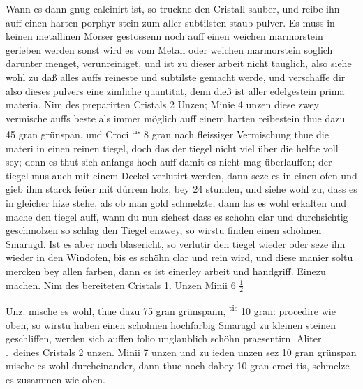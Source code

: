 Wann es dann gnug calcinirt ist, so truckne den Cristall sauber, und reibe ihn auff einen harten porphyr-stein zum aller subtilsten staub-pulver. Es muss in keinen metallinen M\"{o}rser gestossenn noch auff einen weichen marmorstein gerieben werden sonst wird es vom Metall oder weichen marmorstein soglich darunter menget, verunreiniget, und ist zu dieser arbeit nicht tauglich, also siehe wohl zu da{\ss} alles auffs reineste und subtilste gemacht werde, und verschaffe dir also dieses pulvers eine zimliche quantit\"{a}t, denn die{\ss} ist aller edelgestein prima materia.
\pend%
\count{}
\pstart%
\protect{}
Nim des preparirten Cristals 2 Unzen; Minie 4 unzen diese zwey vermische auffs beste als immer m\"{o}glich auff einem harten reibestein thue dazu 45 gran gr\"{u}nspan. und Croci \mars\textsuperscript{tis} 8 gran nach fleissiger Vermischung thue die materi in einen reinen tiegel, doch das der tiegel nicht viel \"{u}ber die helfte voll sey; denn es thut sich anfangs hoch auff damit es nicht mag \"{u}berlauffen; der tiegel mus auch mit einem Deckel verlutirt werden, dann seze es in einen ofen und gieb ihm starck fe\"{u}er mit d\"{u}rrem holz, bey 24 stunden, und siehe wohl zu, dass es in gleicher hize stehe, als ob man gold schmelzte, dann las es wohl erkalten und mache den tiegel auff, wann du nun siehest dass es schohn clar und durchsichtig geschmolzen so schlag den Tiegel\protect{} enzwey, so wirstu finden einen sch\"{o}hnen Smaragd\protect{}. Ist es aber noch blasericht, so verlutir den tiegel wieder oder seze ihn wieder in den Windofen, bis es sch\"{o}hn clar und rein wird, und diese manier soltu mercken bey allen farben, dann es ist einerley arbeit und handgriff.
\pend%
\pstart%
Eine\protect{}zu machen.
Nim des bereiteten Cristals 1. Unzen Minii 6 $\displaystyle\frac{1}{2}$\rule[-4mm]{0mm}{10mm} Unz. mische es wohl, thue dazu 75 gran gr\"{u}nspann,
\mars\textsuperscript{tis} 10 gran: procedire wie oben, so wirstu haben einen schohnen hochfarbig Smaragd\protect{} zu kleinen steinen geschliffen, werden sich auffen folio unglaublich sch\"{o}hn praesentirn.
\pend%
\pstart%
Aliter \textrecipe.\ deines Cristals 2 unzen. Minii 7 unzen und zu ieden unzen sez 10 gran gr\"{u}nspan mische es wohl durcheinander, dann thue noch dabey 10 gran croci tis, schmelze es zusammen wie oben.
